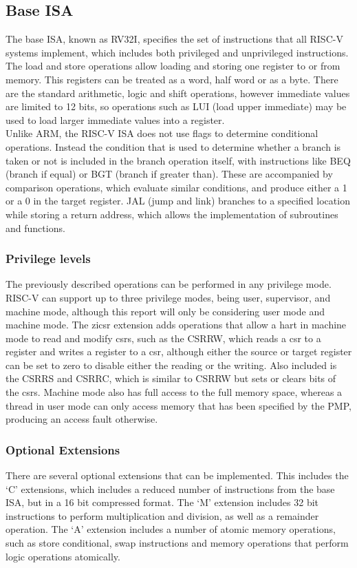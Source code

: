 \subsection{Base ISA}
The base ISA, known as RV32I, specifies the set of instructions that all RISC-V systems implement, which includes both privileged and unprivileged instructions. The load and store operations allow loading and storing one register to or from memory. This registers can be treated as a word, half word or as a byte. There are the standard arithmetic, logic and shift operations, however immediate values are limited to 12 bits, so operations such as LUI (load upper immediate) may be used to load larger immediate values into a register.\\
Unlike ARM, the RISC-V ISA does not use flags to determine conditional operations. Instead the condition that is used to determine whether a branch is taken or not is included in the branch operation itself, with instructions like BEQ (branch if equal) or BGT (branch if greater than). These are accompanied by comparison operations, which evaluate similar conditions, and produce either a 1 or a 0 in the target register. JAL (jump and link) branches to a specified location while storing a return address, which allows the implementation of subroutines and functions. 
\subsubsection{Privilege levels}
The previously described operations can be performed in any privilege mode. RISC-V can support up to three privilege modes, being user, supervisor, and machine mode, although this report will only be considering user mode and machine mode. The zicsr extension adds operations that allow a hart in machine mode to read and modify \ac{csrs}, such as the CSRRW, which reads a csr to a register and writes a register to a csr, although either the source or target register can be set to zero to disable either the reading or the writing. Also included is the CSRRS and CSRRC, which is similar to CSRRW but sets or clears bits of the \ac{csrs}. Machine mode also has full access to the full memory space, whereas a thread in user mode can only access memory that has been specified by the PMP, producing an access fault otherwise.
\subsubsection{Optional Extensions}
There are several optional extensions that can be implemented. This includes the `C' extensions, which includes a reduced number of instructions from the base ISA, but in a 16 bit compressed format. The `M' extension includes 32 bit instructions to perform multiplication and division, as well as a remainder operation. The `A' extension includes a number of atomic memory operations, such as store conditional, swap instructions and memory operations that perform logic operations atomically.
